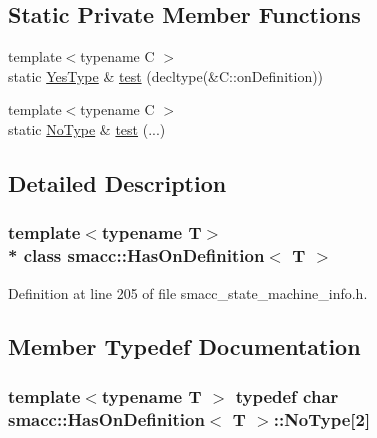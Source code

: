\subsection*{Static Private Member Functions}
\begin{DoxyCompactItemize}
\item 
{\footnotesize template$<$typename C $>$ }\\static \hyperlink{classsmacc_1_1HasOnDefinition_af147416543b9d5a19d3dfc4f3f0d42a6}{Yes\+Type} \& \hyperlink{classsmacc_1_1HasOnDefinition_ab3431b8ab4f2d559df5bee2c06e75d39}{test} (decltype(\&C\+::on\+Definition))
\item 
{\footnotesize template$<$typename C $>$ }\\static \hyperlink{classsmacc_1_1HasOnDefinition_ab424fbc32a091d6271cabe47eb0725ca}{No\+Type} \& \hyperlink{classsmacc_1_1HasOnDefinition_a1cd0d70f99ffb2ac329a72e61815d5e4}{test} (...)
\end{DoxyCompactItemize}


\subsection{Detailed Description}
\subsubsection*{template$<$typename T$>$\\*
class smacc\+::\+Has\+On\+Definition$<$ T $>$}



Definition at line 205 of file smacc\+\_\+state\+\_\+machine\+\_\+info.\+h.



\subsection{Member Typedef Documentation}
\subsubsection[{\texorpdfstring{No\+Type}{NoType}}]{\setlength{\rightskip}{0pt plus 5cm}template$<$typename T $>$ typedef char {\bf smacc\+::\+Has\+On\+Definition}$<$ T $>$\+::No\+Type\mbox{[}2\mbox{]}\hspace{0.3cm}{\ttfamily [private]}}\hypertarget{classsmacc_1_1HasOnDefinition_ab424fbc32a091d6271cabe47eb0725ca}{}\label{classsmacc_1_1HasOnDefinition_ab424fbc32a091d6271cabe47eb0725ca}


